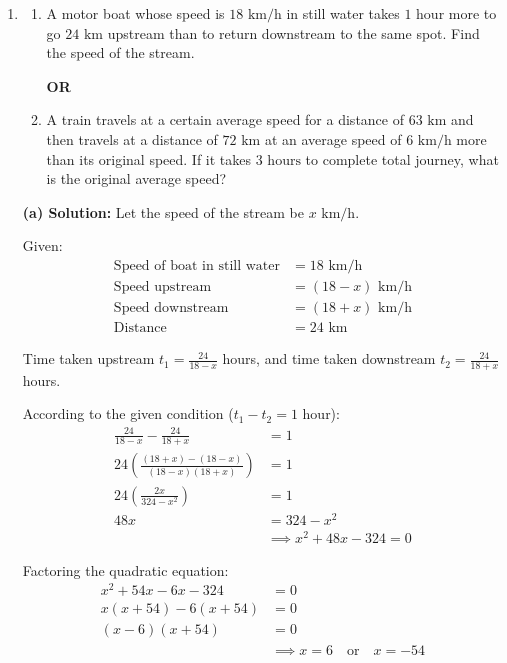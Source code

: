 \begin{enumerate}[label=\thesubsection.\arabic*, ref=\thesubsection.\theenumi]
    \item 
    \begin{enumerate}[label=(\alph*), leftmargin=1.5em, labelsep=0.5em]
        \item A motor boat whose speed is $18\text{ km/h}$ in still water takes $1\text{ hour}$ more to go $24\text{ km}$ upstream than to return downstream to the same spot. Find the speed of the stream.
        
        \vspace{0.5em}
        \begin{center}
            \textbf{OR}
        \end{center}
        \vspace{0.5em}

        \item A train travels at a certain average speed for a distance of $63\text{ km}$ and then travels at a distance of $72\text{ km}$ at an average speed of $6\text{ km/h}$ more than its original speed. If it takes $3\text{ hours}$ to complete total journey, what is the original average speed?
    \end{enumerate}	\vspace{2pt}
    \noindent\textbf{(a) Solution:} Let the speed of the stream be $x\text{ km/h}$.

Given:
\begin{align}
    \text{Speed of boat in still water} &= 18\text{ km/h} \\
    \text{Speed upstream} &= (18 - x)\text{ km/h} \\
    \text{Speed downstream} &= (18 + x)\text{ km/h} \\
    \text{Distance} &= 24\text{ km}
\end{align}

Time taken upstream $t_1 = \frac{24}{18 - x}$ hours, and time taken downstream $t_2 = \frac{24}{18 + x}$ hours.

According to the given condition ($t_1 - t_2 = 1$ hour):
\begin{align}
    \frac{24}{18 - x} - \frac{24}{18 + x} &= 1 \\
    24 \left( \frac{(18 + x) - (18 - x)}{(18 - x)(18 + x)} \right) &= 1 \\
    24 \left( \frac{2x}{324 - x^2} \right) &= 1 \\
    48x &= 324 - x^2 \\
    &\implies x^2 + 48x - 324 = 0
\end{align}

Factoring the quadratic equation:
\begin{align}
    x^2 + 54x - 6x - 324 &= 0 \\
    x(x + 54) - 6(x + 54) &= 0 \\
    (x - 6)(x + 54) &= 0 \\
    &\implies x = 6 \quad \text{or} \quad x = -54
\end{align}


\end{enumerate}
